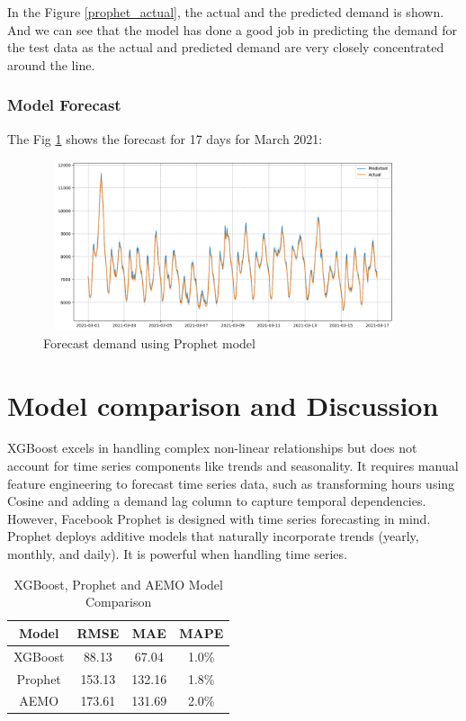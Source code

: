 \documentclass[mstat,12pt]{unswthesis}
\begin{document}
In the Figure \ref{prophet_actual}, the actual and the predicted demand
is shown. And we can see that the model has done a good job in
predicting the demand for the test data as the actual and predicted
demand are very closely concentrated around the line.

\subsection{Model Forecast}\label{model-forecast}

The Fig \ref{prophet_actual_predict_output} shows the forecast for 17
days for March 2021:

\begin{figure}[H]
\centering
\includegraphics[width=0.95\textwidth, height=5cm]{prophet_actual_predict_output.png}
\caption{Forecast demand using Prophet model}\label{prophet_actual_predict_output}
\end{figure}

\chapter{Model comparison and
Discussion}\label{model-comparison-and-discussion}

XGBoost excels in handling complex non-linear relationships but does not
account for time series components like trends and seasonality. It
requires manual feature engineering to forecast time series data, such
as transforming hours using Cosine and adding a demand lag column to
capture temporal dependencies. However, Facebook Prophet is designed
with time series forecasting in mind. Prophet deploys additive models
that naturally incorporate trends (yearly, monthly, and daily). It is
powerful when handling time series.

\begin{table}[h]
\centering
\caption{XGBoost, Prophet and AEMO Model Comparison}
\begin{tabular}{|c|c|c|c|}
\hline
\hline
\textbf{Model} & \textbf{RMSE} & \textbf{MAE} & \textbf{MAPE}\\ 
\hline
XGBoost & 88.13 & 67.04 & 1.0\% \\ 
\hline
Prophet & 153.13 & 132.16 & 1.8\% \\ 
\hline
AEMO & 173.61 & 131.69 & 2.0\% \\ 
\hline
\end{tabular}
\end{table}
\end{document}

